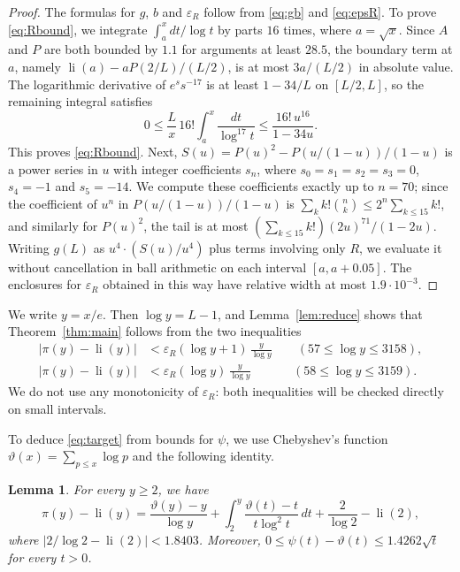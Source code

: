 \documentclass[11pt]{amsart}
\numberwithin{equation}{section}
\newtheorem{lemma}[theorem]{Lemma}
\theoremstyle{definition}
\theoremstyle{remark}
\newcommand{\li}{\operatorname{li}}
\newcommand{\eps}{\varepsilon}
\begin{document}
\begin{proof}
The formulas for $g$, $b$ and $\eps_R$ follow from \eqref{eq:gb} and \eqref{eq:epsR}.
To prove \eqref{eq:Rbound}, we integrate $\int_a^x dt/\log t$ by parts $16$ times, where $a = \sqrt x$.
Since $A$ and $P$ are both bounded by $1.1$ for arguments at least $28.5$, the boundary term at $a$, namely $\li(a) - aP(2/L)/(L/2)$, is at most $3a/(L/2)$ in absolute value.
The logarithmic derivative of $e^s s^{-17}$ is at least $1 - 34/L$ on $[L/2, L]$, so the remaining integral satisfies
\[
0 \leq \frac{L}{x}\,16!\int_a^x\frac{dt}{\log^{17}t} \leq \frac{16!\,u^{16}}{1 - 34u}.
\]
This proves \eqref{eq:Rbound}.
Next, $S(u) = P(u)^2 - P(u/(1-u))/(1-u)$ is a power series in $u$ with integer coefficients $s_n$, where $s_0 = s_1 = s_2 = s_3 = 0$, $s_4 = -1$ and $s_5 = -14$.
We compute these coefficients exactly up to $n = 70$; since the coefficient of $u^n$ in $P(u/(1-u))/(1-u)$ is $\sum_kk!\binom nk \leq 2^n\sum_{k\leq15}k!$, and similarly for $P(u)^2$, the tail is at most $(\sum_{k\leq15}k!)(2u)^{71}/(1-2u)$.
Writing $g(L)$ as $u^4\cdot(S(u)/u^4)$ plus terms involving only $R$, we evaluate it without cancellation in ball arithmetic on each interval $[a, a+0.05]$.
The enclosures for $\eps_R$ obtained in this way have relative width at most $1.9\cdot10^{-3}$.
\end{proof}

We write $y = x/e$.
Then $\log y = L - 1$, and Lemma~\ref{lem:reduce} shows that Theorem~\ref{thm:main} follows from the two inequalities
\begin{equation}\label{eq:target}
\begin{aligned}
|\pi(y) - \li(y)| &< \eps_R(\log y + 1)\,\frac{y}{\log y} \qquad (57 \leq \log y \leq 3158),\\
|\pi(y) - \li(y)| &< \eps_R(\log y)\,\frac{y}{\log y} \qquad\quad\ \, (58 \leq \log y \leq 3159).
\end{aligned}
\end{equation}
We do not use any monotonicity of $\eps_R$: both inequalities will be checked directly on small intervals.

To deduce \eqref{eq:target} from bounds for $\psi$, we use Chebyshev's function $\vartheta(x) = \sum_{p\leq x}\log p$ and the following identity.

\begin{lemma}\label{lem:transfer}
For every $y \geq 2$, we have
\begin{equation}\label{eq:pili}
\pi(y) - \li(y) = \frac{\vartheta(y) - y}{\log y} + \int_2^y \frac{\vartheta(t) - t}{t\log^2t}\,dt + \frac{2}{\log 2} - \li(2),
\end{equation}
where $|2/\log 2 - \li(2)| < 1.8403$.
Moreover, $0 \leq \psi(t) - \vartheta(t) \leq 1.4262\sqrt t$ for every $t > 0$.
\end{lemma}
\end{document}
